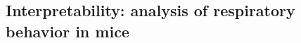 \vspace{-1ex}
\subsection{Interpretability: analysis of respiratory behavior in mice}
\label{section:interpretability}
\vspace{-1ex}

